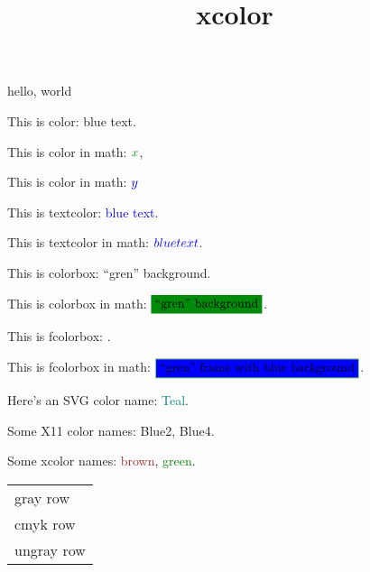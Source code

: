 \documentclass{amsart}
\title{xcolor}
\begin{document}
\maketitle

hello, world



This is color: {\color{blue} blue text}.

This is color in math: $\color{gren} x$,

This is color in math: $\color{blue} y$

This is textcolor: \textcolor{blue}{blue text}.

This is textcolor in math: $\textcolor{blue}{blue text}$.

This is colorbox: \colorbox{gren}{``gren'' background}.

This is colorbox in math: $\colorbox{gren}{``gren'' background}$.

This is fcolorbox: .

This is fcolorbox in math: $\fcolorbox{gren}{blue}{``gren'' frame with blue background}$.

Here's an SVG color name: \textcolor{Teal}{Teal}.

Some X11 color names: \textcolor{Blue2}{Blue2}, \textcolor{Blue4}{Blue4}.

Some xcolor names: \textcolor{brown}{brown}, \textcolor{green}{green}.

\begin{table}
\begin{tabular}{l}
\rowcolor{gray!50} gray row\\
\rowcolor[cmyk]{0.7,0.5,0.3,0.5}cmyk row\\
ungray row
\end{tabular}
\end{table}
\end{document}
